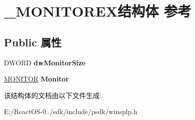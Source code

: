 \hypertarget{struct___m_o_n_i_t_o_r_e_x}{}\section{\+\_\+\+M\+O\+N\+I\+T\+O\+R\+E\+X结构体 参考}
\label{struct___m_o_n_i_t_o_r_e_x}
\subsection*{Public 属性}
\begin{DoxyCompactItemize}
\item 
\mbox{\label{struct___m_o_n_i_t_o_r_e_x_a53c353a84326f67683440d573e072cb7}} 
D\+W\+O\+RD {\bfseries dw\+Monitor\+Size}
\item 
\mbox{\label{struct___m_o_n_i_t_o_r_e_x_a0d746fe4ffb75f382f3aef11e0940017}} 
\hyperlink{struct___m_o_n_i_t_o_r}{M\+O\+N\+I\+T\+OR} {\bfseries Monitor}
\end{DoxyCompactItemize}


该结构体的文档由以下文件生成\+:\begin{DoxyCompactItemize}
\item 
E\+:/\+React\+O\+S-\/0../sdk/include/psdk/winsplp.\+h\end{DoxyCompactItemize}
